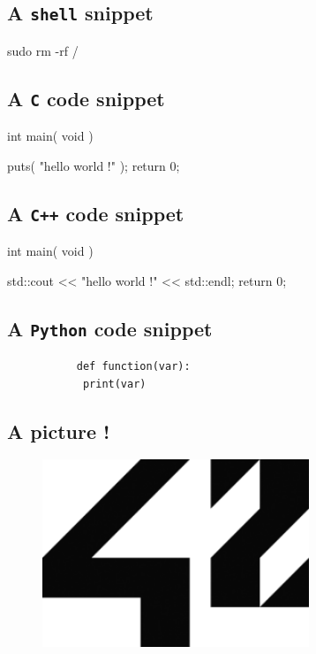 \documentclass{42-en}
\begin{document}
        \subsection{A \texttt{shell} snippet}

           \begin{42console}
sudo rm -rf /\end{42console}



        \subsection{A \texttt{C} code snippet}

           \begin{42ccode}
int main( void ) {

    puts( "hello world !" );
    return 0;
}
\end{42ccode}


        \subsection{A \texttt{C++} code snippet}

            \begin{42cppcode}
int main( void ) {

    std::cout << "hello world !" << std::endl;
    return 0;
}
\end{42cppcode}


        \subsection{A \texttt{Python} code snippet}

           \begin{verbatim}
           def function(var):
            print(var)
           \end{verbatim}
           


        \subsection{A picture !}

            \begin{figure}[H]
                \begin{center}
                    \includegraphics[width=8cm]{42.png}
                \end{center}
            \end{figure}
\end{document}
